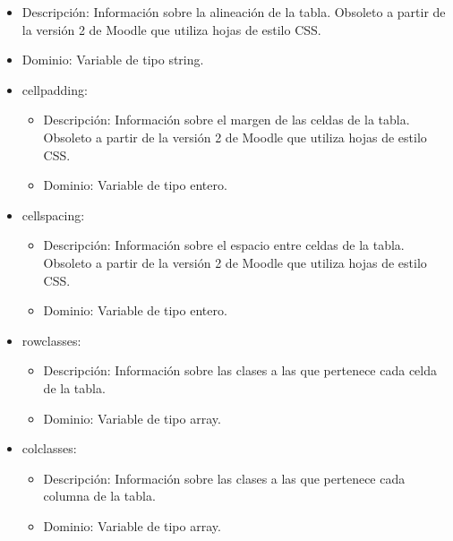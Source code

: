 \begin{itemize}
\begin{itemize}
\begin{itemize}
					\item Descripción:  Información sobre la alineación de la tabla. Obsoleto a partir de la versión 2 de Moodle que utiliza hojas de estilo CSS.
					\item Dominio: Variable de tipo string.
				\end{itemize}
		\end{itemize}
		\begin{itemize}
			\item cellpadding:
				\begin{itemize}
					\item Descripción:  Información sobre el margen de las celdas de la tabla. Obsoleto a partir de la versión 2 de Moodle que utiliza hojas de estilo CSS.
					\item Dominio: Variable de tipo entero.
				\end{itemize}
		\end{itemize}
		\begin{itemize}
			\item cellspacing:
				\begin{itemize}
					\item Descripción:  Información sobre el espacio entre celdas de la tabla. Obsoleto a partir de la versión 2 de Moodle que utiliza hojas de estilo CSS.
					\item Dominio: Variable de tipo entero.
				\end{itemize}
		\end{itemize}
		\begin{itemize}
			\item rowclasses:
				\begin{itemize}
					\item Descripción: Información sobre las clases a las que pertenece cada celda de la tabla.
					\item Dominio: Variable de tipo array.
				\end{itemize}
		\end{itemize}
		\begin{itemize}
			\item colclasses:
				\begin{itemize}
					\item Descripción: Información sobre las clases a las que pertenece cada columna de la tabla.
					\item Dominio: Variable de tipo array.
				\end{itemize}
		\end{itemize}
		\begin{itemize}

\end{itemize}
\end{itemize}
